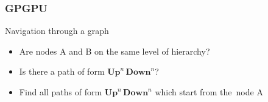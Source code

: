 \documentclass[xcolor=table]{beamer}
\begin{document}
\begin{frame}[fragile]
  \transwipe[direction=90]
  \frametitle{GPGPU}
  \begin{minipage}[m]{0.45\linewidth}
\end{minipage}\hfill
\begin{minipage}[m]{0.5\linewidth}
Navigation through a graph
\begin{itemize}
      \item Are nodes A and B on the same level of hierarchy?
      \item Is there a path of form $\textbf{Up}^n \, \textbf{Down}^n$?
      \item Find all paths of form $\textbf{Up}^n \, \textbf{Down}^n$ which start from the~node A
\end{itemize}

\end{minipage}

\end{frame}
\end{document}

